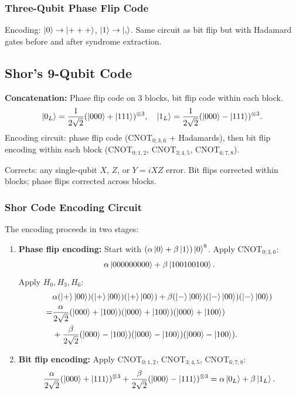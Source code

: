 \documentclass[10pt,a4paper]{article}
\begin{document}
\subsubsection*{Three-Qubit Phase Flip Code}

Encoding: $\ket{0}\to\ket{+++}$, $\ket{1}\to\ket{, }$. Same circuit as bit flip but with Hadamard gates before and after syndrome extraction.

\subsection{Shor's 9-Qubit Code}

\begin{tcolorbox}[algostyle, title={Algorithm: Shor 9-Qubit Code}]
\textbf{Concatenation:} Phase flip code on 3 blocks, bit flip code within each block.
\[
\ket{0_L}=\frac{1}{2\sqrt{2}}(\ket{000}+\ket{111})^{\otimes 3},\quad \ket{1_L}=\frac{1}{2\sqrt{2}}(\ket{000}-\ket{111})^{\otimes 3}.
\]
Encoding circuit: phase flip code (CNOT$_{0;3,6}$ + Hadamards), then bit flip encoding within each block (CNOT$_{0;1,2}$, CNOT$_{3;4,5}$, CNOT$_{6;7,8}$).

Corrects: any single-qubit $X$, $Z$, or $Y=iXZ$ error. Bit flips corrected within blocks; phase flips corrected across blocks.
\end{tcolorbox}

\subsubsection*{Shor Code Encoding Circuit}

The encoding proceeds in two stages:
\begin{enumerate}
\item \textbf{Phase flip encoding:} Start with $(\alpha\ket{0}+\beta\ket{1})\ket{0}^8$. Apply CNOT$_{0;3,6}$:
\[
\alpha\ket{000000000}+\beta\ket{100100100}.
\]
Apply $H_0, H_3, H_6$:
\begin{align*}
&\alpha(\ket{+}\ket{00})(\ket{+}\ket{00})(\ket{+}\ket{00})+\beta(\ket{-}\ket{00})(\ket{-}\ket{00})(\ket{-}\ket{00})\\
=&\frac{\alpha}{2\sqrt{2}}(\ket{000}+\ket{100})(\ket{000}+\ket{100})(\ket{000}+\ket{100})\\
&+\frac{\beta}{2\sqrt{2}}(\ket{000}-\ket{100})(\ket{000}-\ket{100})(\ket{000}-\ket{100}).
\end{align*}

\item \textbf{Bit flip encoding:} Apply CNOT$_{0;1,2}$, CNOT$_{3;4,5}$, CNOT$_{6;7,8}$:
\[
\frac{\alpha}{2\sqrt{2}}(\ket{000}+\ket{111})^{\otimes 3}+\frac{\beta}{2\sqrt{2}}(\ket{000}-\ket{111})^{\otimes 3}=\alpha\ket{0_L}+\beta\ket{1_L}.
\]
\end{enumerate}
\end{document}
